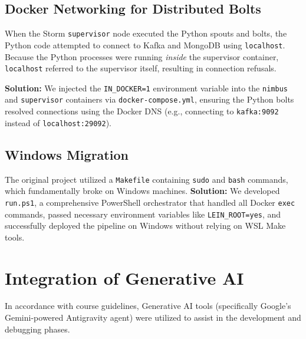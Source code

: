 \documentclass[12pt]{article}
\begin{document}
\subsection{Docker Networking for Distributed Bolts}
When the Storm \texttt{supervisor} node executed the Python spouts and bolts, the Python code attempted to connect to Kafka and MongoDB using \texttt{localhost}. Because the Python processes were running \textit{inside} the supervisor container, \texttt{localhost} referred to the supervisor itself, resulting in connection refusals.

\textbf{Solution:} We injected the \texttt{IN\_DOCKER=1} environment variable into the \texttt{nimbus} and \texttt{supervisor} containers via \texttt{docker-compose.yml}, ensuring the Python bolts resolved connections using the Docker DNS (e.g., connecting to \texttt{kafka:9092} instead of \texttt{localhost:29092}).

\subsection{Windows Migration}
The original project utilized a \texttt{Makefile} containing \texttt{sudo} and \texttt{bash} commands, which fundamentally broke on Windows machines.
\textbf{Solution:} We developed \texttt{run.ps1}, a comprehensive PowerShell orchestrator that handled all Docker \texttt{exec} commands, passed necessary environment variables like \texttt{LEIN\_ROOT=yes}, and successfully deployed the pipeline on Windows without relying on WSL Make tools.

\newpage
\section{Integration of Generative AI}
In accordance with course guidelines, Generative AI tools (specifically Google's Gemini-powered Antigravity agent) were utilized to assist in the development and debugging phases. 
\end{document}
